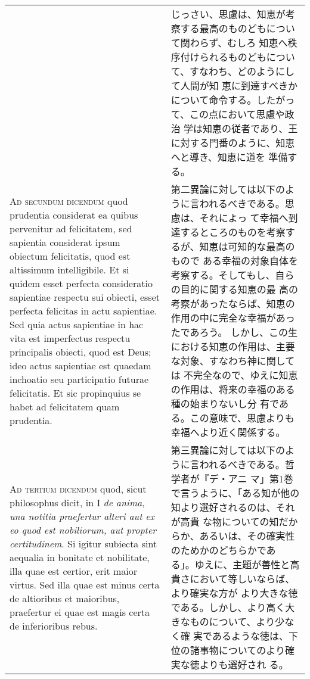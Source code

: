 \documentclass[10pt]{jsarticle}
\begin{document}
\begin{longtable}{p{21em}p{21em}}
&

じっさい、思慮は、知恵が考察する最高のものどもについて関わらず、むしろ
知恵へ秩序付けられるものどもについて、すなわち、どのようにして人間が知
恵に到達すべきかについて命令する。したがって、この点において思慮や政治
学は知恵の従者であり、王に対する門番のように、知恵へと導き、知恵に道を
準備する。
 
\\


{\scshape Ad secundum dicendum} quod prudentia considerat ea quibus
pervenitur ad felicitatem, sed sapientia considerat ipsum obiectum
felicitatis, quod est altissimum intelligibile. Et si quidem esset
perfecta consideratio sapientiae respectu sui obiecti, esset perfecta
felicitas in actu sapientiae. Sed quia actus sapientiae in hac vita
est imperfectus respectu principalis obiecti, quod est Deus; ideo
actus sapientiae est quaedam inchoatio seu participatio futurae
felicitatis. Et sic propinquius se habet ad felicitatem quam
prudentia.

&

 第二異論に対しては以下のように言われるべきである。思慮は、それによっ
 て幸福へ到達するところのものを考察するが、知恵は可知的な最高のもので
 ある幸福の対象自体を考察する。そしてもし、自らの目的に関する知恵の最
 高の考察があったならば、知恵の作用の中に完全な幸福があったであろう。
 しかし、この生における知恵の作用は、主要な対象、すなわち神に関しては
 不完全なので、ゆえに知恵の作用は、将来の幸福のある種の始まりないし分
 有である。この意味で、思慮よりも幸福へより近く関係する。

\\


{\scshape Ad tertium dicendum} quod, sicut philosophus dicit, in I
{\itshape de anima}, {\itshape una notitia praefertur alteri aut ex eo
quod est nobiliorum, aut propter certitudinem}. Si igitur subiecta
sint aequalia in bonitate et nobilitate, illa quae est certior, erit
maior virtus. Sed illa quae est minus certa de altioribus et
maioribus, praefertur ei quae est magis certa de inferioribus rebus.

&

 第三異論に対しては以下のように言われるべきである。哲学者が『デ・アニ
 マ」第1巻で言うように、「ある知が他の知より選好されるのは、それが高貴
 な物についての知だからか、あるいは、その確実性のためかのどちらかであ
 る」。ゆえに、主題が善性と高貴さにおいて等しいならば、より確実な方が
 より大きな徳である。しかし、より高く大きなものについて、より少なく確
 実であるような徳は、下位の諸事物についてのより確実な徳よりも選好され
 る。
 


\end{longtable}
\end{document}
